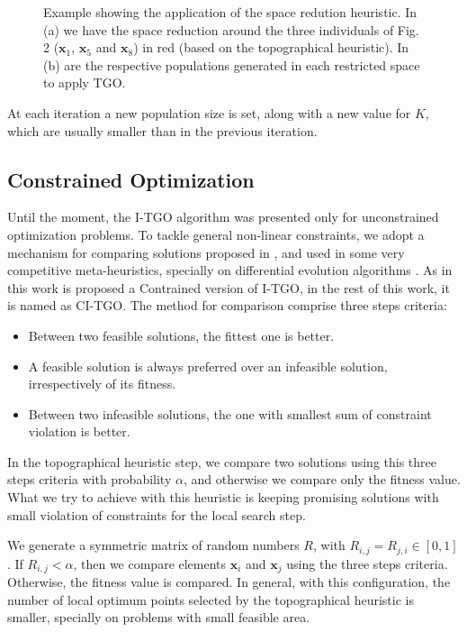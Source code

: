 \begin{figure}[tp]
\begin{subfigure}{.5\textwidth}
  \caption{}
  \label{fig:SpaceReduction-b}
\end{subfigure}
\caption{Example showing the application of the space redution heuristic. In (a) we have the space reduction around the three individuals of Fig. 2 ($\bm{x}_1$, $\bm{x}_5$ and $\bm{x}_8$) in red (based on the topographical heuristic). In (b) are the respective populations generated in each restricted space to apply TGO.}\label{fig:SpaceReduction}
\end{figure}


At each iteration a new population size is set, along with a new value for $K$, which are usually smaller than in the previous iteration.


\subsection{Constrained Optimization}

Until the moment, the I-TGO algorithm was presented only for unconstrained optimization problems. To tackle general non-linear constraints, we adopt a mechanism for comparing solutions proposed in \cite{ConHandling}, and used in some very competitive meta-heuristics, specially on differential evolution algorithms \citep{DE1, DE2, DE3}. As in this work is proposed a Contrained version of I-TGO, in the rest of this work, it is named as CI-TGO. The method for comparison comprise three steps criteria:

\begin{itemize}

\item Between two feasible solutions, the fittest one is better.

\item A feasible solution is always preferred over an infeasible solution, irrespectively of its fitness.

\item Between two infeasible solutions, the one with smallest sum of constraint violation is better.

\end{itemize}


In the topographical heuristic step, we compare two solutions using this three steps criteria with probability $\alpha$, and otherwise we compare only the fitness value. What we try to achieve with this heuristic is keeping promising solutions with small violation of constraints for the local search step.

We generate a symmetric matrix of random numbers $R$, with $R_{i, j} = R_{j, i} \in [0, 1]$. If $R_{i, j} < \alpha$, then we compare elements $\bm{x}_i$ and $\bm{x}_j$ using the three steps criteria. Otherwise, the fitness value is compared. In general, with this configuration, the number of local optimum points selected by the topographical heuristic is smaller, specially on problems with small feasible area. 

